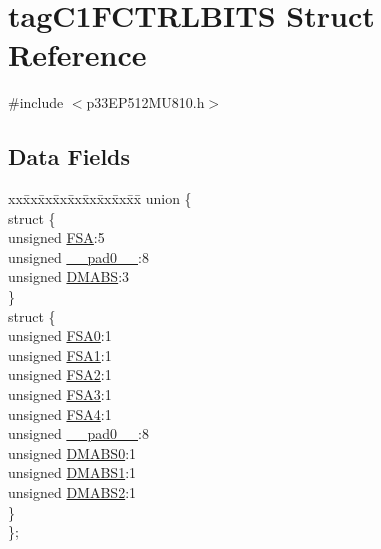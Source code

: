 \hypertarget{structtag_c1_f_c_t_r_l_b_i_t_s}{}\section{tag\+C1\+F\+C\+T\+R\+L\+B\+I\+TS Struct Reference}
\label{structtag_c1_f_c_t_r_l_b_i_t_s}


{\ttfamily \#include $<$p33\+E\+P512\+M\+U810.\+h$>$}

\subsection*{Data Fields}
\begin{DoxyCompactItemize}
\item 
\begin{tabbing}
xx\=xx\=xx\=xx\=xx\=xx\=xx\=xx\=xx\=\kill
union \{\\
\>struct \{\\
\>\>unsigned \hyperlink{structtag_c1_f_c_t_r_l_b_i_t_s_a72e40b76a8df9aef0d3c8304535459a1}{FSA}:5\\
\>\>unsigned \hyperlink{structtag_c1_f_c_t_r_l_b_i_t_s_adf71f3d8410c1f1dbbc96680a92c49af}{\_\_pad0\_\_}:8\\
\>\>unsigned \hyperlink{structtag_c1_f_c_t_r_l_b_i_t_s_a84bc9973170d3648e5138d28fd72705d}{DMABS}:3\\
\>\} \\
\>struct \{\\
\>\>unsigned \hyperlink{structtag_c1_f_c_t_r_l_b_i_t_s_a91943c32ee29d583918a84d9155905d9}{FSA0}:1\\
\>\>unsigned \hyperlink{structtag_c1_f_c_t_r_l_b_i_t_s_a8fe98dd36a42a4681bed7605e267e33e}{FSA1}:1\\
\>\>unsigned \hyperlink{structtag_c1_f_c_t_r_l_b_i_t_s_a468f0e6c061912b0a7bd0f119efcfe61}{FSA2}:1\\
\>\>unsigned \hyperlink{structtag_c1_f_c_t_r_l_b_i_t_s_a20bcf2bebd5be6be1a31fce2812487f1}{FSA3}:1\\
\>\>unsigned \hyperlink{structtag_c1_f_c_t_r_l_b_i_t_s_a612519942ed2303c487fcdfcac0d4efc}{FSA4}:1\\
\>\>unsigned \hyperlink{structtag_c1_f_c_t_r_l_b_i_t_s_adf71f3d8410c1f1dbbc96680a92c49af}{\_\_pad0\_\_}:8\\
\>\>unsigned \hyperlink{structtag_c1_f_c_t_r_l_b_i_t_s_ab21ae68b75b4bf453573c7ab016079a4}{DMABS0}:1\\
\>\>unsigned \hyperlink{structtag_c1_f_c_t_r_l_b_i_t_s_ada40d2f2558198bcf16c506a45c67c42}{DMABS1}:1\\
\>\>unsigned \hyperlink{structtag_c1_f_c_t_r_l_b_i_t_s_a2c0a5870b57109dd60672fe226fa87f0}{DMABS2}:1\\
\>\} \\
\}; \\

\end{tabbing}\end{DoxyCompactItemize}


